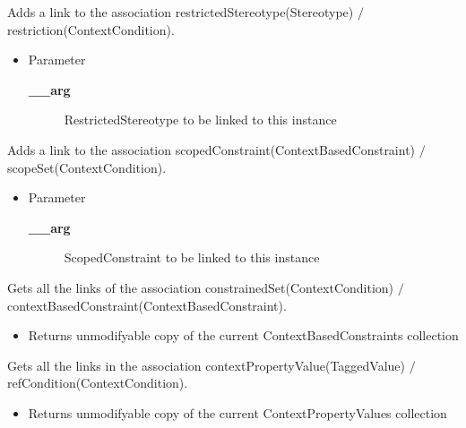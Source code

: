 \begin{desc}Adds a link to the association restrictedStereotype(Stereotype)
 $/$ restriction(ContextCondition).
\begin{itemize}
\item{Parameter
  \begin{description}
   \item[{\bf \_\_arg}]{RestrictedStereotype to be linked to this instance}
  \end{description}}
\end{itemize}
\end{desc}

\begin{desc}Adds a link to the association scopedConstraint(ContextBasedConstraint)
 $/$ scopeSet(ContextCondition).
\begin{itemize}
\item{Parameter
  \begin{description}
   \item[{\bf \_\_arg}]{ScopedConstraint to be linked to this instance}
  \end{description}}
\end{itemize}
\end{desc}

\begin{desc}Gets all the links of the association constrainedSet(ContextCondition)
 $/$ contextBasedConstraint(ContextBasedConstraint).
\begin{itemize}
\item{Returns unmodifyable copy of the current ContextBasedConstraints collection }
\end{itemize}
\end{desc}

\begin{desc}Gets all the links in the association contextPropertyValue(TaggedValue)
 $/$ refCondition(ContextCondition).
\begin{itemize}
\item{Returns unmodifyable copy of the current ContextPropertyValues collection }
\end{itemize}
\end{desc}

